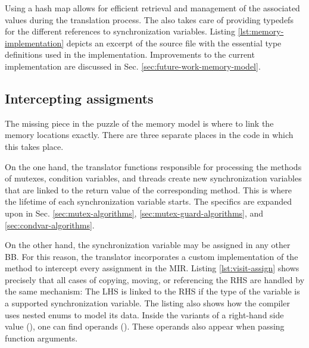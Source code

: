 Using a hash map allows for efficient retrieval
and management of the associated values during the translation process.
The  also takes care of providing typedefs for the different
references to synchronization variables.
Listing \ref{lst:memory-implementation} depicts an excerpt of the source file
with the essential type definitions used in the implementation.
Improvements to the current implementation are discussed in Sec. \ref{sec:future-work-memory-model}.

\subsection{Intercepting assigments}
\label{sec:intercepting-assignments}

The missing piece in the puzzle of the memory model is
where to link the memory locations exactly.
There are three separate places in the code in which this takes place.

On the one hand, the translator functions responsible for processing the methods
of mutexes, condition variables, and threads create new synchronization variables
that are linked to the return value of the corresponding method.
This is where the lifetime of each synchronization variable starts.
The specifics are expanded upon in Sec. \ref{sec:mutex-algorithms},
\ref{sec:mutex-guard-algorithms}, and \ref{sec:condvar-algorithms}.

On the other hand, the synchronization variable may be assigned in any other \acrshort{BB}.
For this reason, the translator incorporates a custom implementation of the method
 to intercept every assignment in the \acrshort{MIR}.
Listing \ref{lst:visit-assign} shows precisely
that all cases of copying, moving, or referencing the \acrfull{RHS}
are handled by the same mechanism:
The \acrfull{LHS} is linked to the \acrfull{RHS}
if the type of the variable is a supported synchronization variable.
The listing also shows how the compiler uses nested enums to model its data.
Inside the variants of a right-hand side value (),
one can find operands ().
These operands also appear when passing function arguments.


